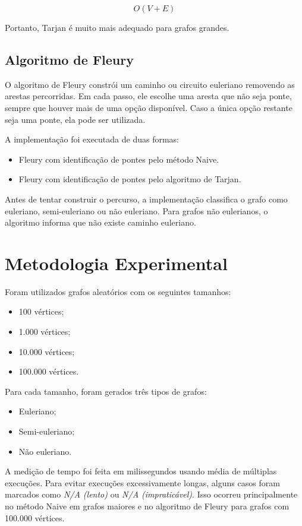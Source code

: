\documentclass[a4paper,12pt]{article}
\begin{document}
\[
O(V+E)
\]

Portanto, Tarjan é muito mais adequado para grafos grandes.

\subsection{Algoritmo de Fleury}

O algoritmo de Fleury constrói um caminho ou circuito euleriano removendo as arestas percorridas. Em cada passo, ele escolhe uma aresta que não seja ponte, sempre que houver mais de uma opção disponível. Caso a única opção restante seja uma ponte, ela pode ser utilizada.

A implementação foi executada de duas formas:

\begin{itemize}
    \item Fleury com identificação de pontes pelo método Naive.
    \item Fleury com identificação de pontes pelo algoritmo de Tarjan.
\end{itemize}

Antes de tentar construir o percurso, a implementação classifica o grafo como euleriano, semi-euleriano ou não euleriano. Para grafos não eulerianos, o algoritmo informa que não existe caminho euleriano.

\section{Metodologia Experimental}

Foram utilizados grafos aleatórios com os seguintes tamanhos:

\begin{itemize}
    \item 100 vértices;
    \item 1.000 vértices;
    \item 10.000 vértices;
    \item 100.000 vértices.
\end{itemize}

Para cada tamanho, foram gerados três tipos de grafos:

\begin{itemize}
    \item Euleriano;
    \item Semi-euleriano;
    \item Não euleriano.
\end{itemize}

A medição de tempo foi feita em milissegundos usando média de múltiplas execuções. Para evitar execuções excessivamente longas, alguns casos foram marcados como \textit{N/A (lento)} ou \textit{N/A (impraticável)}. Isso ocorreu principalmente no método Naive em grafos maiores e no algoritmo de Fleury para grafos com 100.000 vértices.
\end{document}
